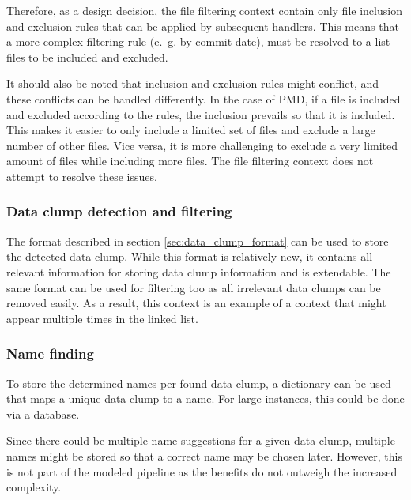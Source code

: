 Therefore, as a design decision, the file filtering context contain only file inclusion and exclusion rules that can be applied by subsequent handlers. This means that a more complex filtering rule (e.~g. by commit date), must be resolved to a list files to be included and excluded. 

It should also be noted that inclusion and exclusion rules might conflict, and these conflicts can be handled differently. In the case of PMD, if a file is included and excluded according to the rules, the inclusion prevails so that it is included. This makes it easier to only include a limited set of files and exclude a large number of other files. Vice versa, it is more challenging to exclude a very limited amount of files while including more files. The file filtering context does not attempt to resolve these issues. 

\begin{comment}
\subsubsection{Extraction of AST}
\end{comment}
\subsubsection{Data clump detection and filtering}

The format described in section \ref{sec:data_clump_format} can be used to store the detected data clump. While this format is relatively new, it contains all relevant information for storing data clump information and is extendable. The same format can be used for filtering too as all irrelevant data clumps can be removed easily. As a result, this context is an example of a context that might appear multiple times in the linked list. 

\subsubsection{Name finding}
To store the determined names per found data clump, a dictionary can be used that maps a unique data clump to a name. For large instances, this could be done via a database. 

Since there could be multiple name suggestions for a given data clump, multiple names might be stored so that a correct name may be chosen later. However, this is not part of the modeled pipeline as the benefits do not outweigh the increased complexity.

